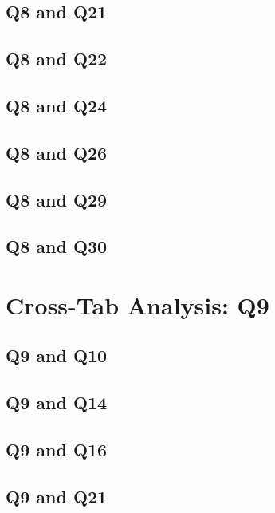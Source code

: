 \documentclass{report}
\begin{document}
\clearpage
\section{Q8 and Q21}


\clearpage
\section{Q8 and Q22}


\clearpage
\section{Q8 and Q24}


\clearpage
\section{Q8 and Q26}


\clearpage
\section{Q8 and Q29}


\clearpage
\section{Q8 and Q30}


\chapter{Cross-Tab Analysis: Q9}
\section{Q9 and Q10}


\clearpage
\section{Q9 and Q14}


\clearpage
\section{Q9 and Q16}


\clearpage
\section{Q9 and Q21}

\end{document}
